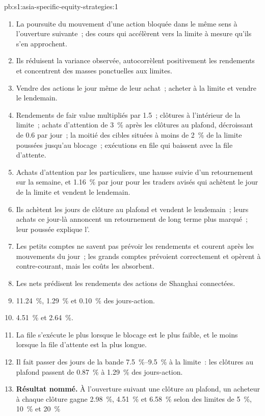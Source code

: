 \begin{solution}{pb:s1:asia-specific-equity-strategies:1}
\begin{enumerate}
\item La poursuite du mouvement d'une action bloquée dans le même sens à l'ouverture suivante~; des cours qui accélèrent vers la limite à mesure qu'ils s'en approchent.
\item Ils réduisent la variance observée, autocorrèlent positivement les rendements et concentrent des masses ponctuelles aux limites.
\item Vendre des actions le jour même de leur achat~; acheter à la limite et vendre le lendemain.
\item Rendements de fair value multipliés par 1.5~; clôtures à l'intérieur de la limite~; achats d'attention de 3~\% après les clôtures au plafond, décroissant de 0.6 par jour~; la moitié des cibles situées à moins de
2~\% de la limite poussées jusqu'au blocage~; exécutions en file qui baissent avec la file d'attente.
\item Achats d'attention par les particuliers, une hausse suivie d'un retournement sur la semaine, et 1.16~\% par jour pour les traders avisés qui achètent le jour de la limite et vendent le
lendemain.
\item Ils achètent les jours de clôture au plafond et vendent le lendemain~; leurs achats ce jour-là annoncent un retournement de long terme plus marqué~; leur poussée explique l'.
\item Les petits comptes ne savent pas prévoir les rendements et courent après les mouvements du jour~; les grands comptes prévoient correctement et opèrent à contre-courant, mais les coûts les absorbent.
\item Les  nets prédisent les rendements des actions de Shanghai connectées.
\item 11.24~\%, 1.29~\% et 0.10~\% des jours-action.
\item 4.51~\% et 2.64~\%.
\item La file s'exécute le plus lorsque le blocage est le plus faible, et le moins lorsque la file d'attente est la plus longue.
\item Il fait passer des jours de la bande 7.5~\%--9.5~\% à la limite~: les clôtures au plafond passent de 0.87~\% à 1.29~\% des jours-action.
\item \textbf{Résultat nommé.} À l'ouverture suivant une clôture au plafond, un acheteur à chaque clôture gagne 2.98~\%, 4.51~\% et 6.58~\% selon des limites de 5~\%, 10~\% et 20~\%

\end{enumerate}
\end{solution}
